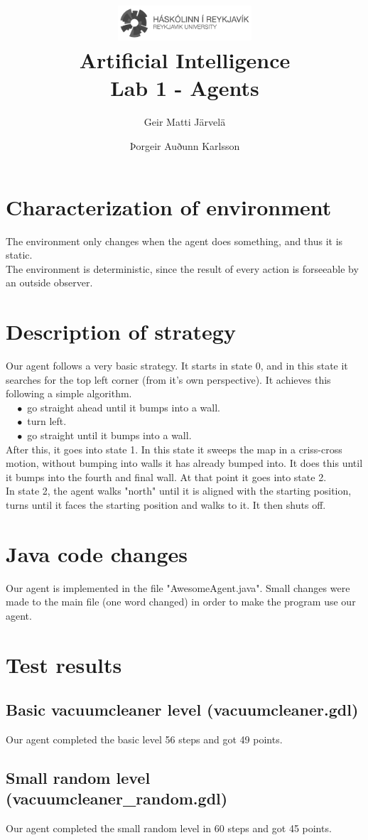 \documentclass[11pt]{article}
\title{\includegraphics[width=5cm]{HR-Logo-bw} \\Artificial Intelligence\\ Lab 1 - Agents}
\author{Geir Matti Järvelä \and Þorgeir Auðunn Karlsson}
\begin{document}
\maketitle
\section{Characterization of environment}
The environment only changes when the agent does something, and thus it is static.  \\
The environment is deterministic, since the result of every action is forseeable by an outside observer.
\section{Description of strategy}
Our agent follows a  very basic strategy. It starts in state 0, and in this state it searches for the top left  corner (from it's own perspective). 
It achieves this following a simple algorithm. \\
$\quad\bullet$ go straight ahead until it bumps into a wall. \\
$\quad\bullet$ turn left. \\
$\quad\bullet$ go straight until it bumps into a wall. \\
After this, it goes into state 1. In this state it sweeps the map in a criss-cross motion, without bumping into walls it has already bumped into. It does this 
until it bumps into the fourth and final wall. At that point it goes into state 2. \\
In state 2, the agent walks "north" until it is aligned with the starting position, turns until it faces the starting position and walks to it. It then shuts off.
\section{Java code changes}
Our agent is implemented in the file "AwesomeAgent.java". Small changes were made to the main file (one word changed) in order to make the program use our agent.
\section{Test results}
\subsection{Basic vacuumcleaner level (vacuumcleaner.gdl)}
Our agent completed the basic level 56 steps and got 49 points.
\subsection{Small random level (vacuumcleaner\_random.gdl)}
Our agent completed the small random level in 60 steps and got 45 points.
\end{document}
